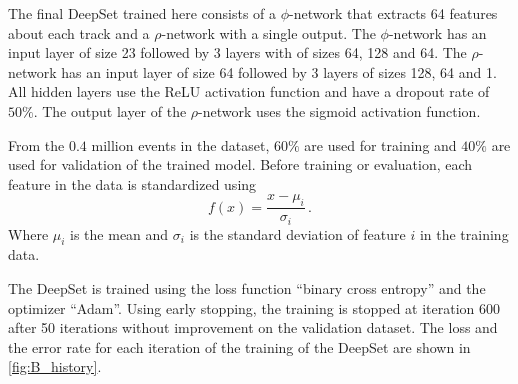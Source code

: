 The final DeepSet trained here consists of a $\phi$-network that extracts 64 features about each track and a $\rho$-network with a single output.
The $\phi$-network has an input layer of size 23 followed by 3 layers with of sizes 64, 128 and 64.
The $\rho$-network has an input layer of size 64 followed by 3 layers of sizes 128, 64 and 1.
All hidden layers use the ReLU activation function and have a dropout rate of $50\%$.
The output layer of the $\rho$-network uses the sigmoid activation function.

From the $0.4$ million events in the dataset, $60\%$ are used for training and $40\%$ are used for validation of the trained model.
Before training or evaluation, each feature in the data is standardized using 
\begin{equation*}
    f(x) = \frac{x - \mu_i}{\sigma_i} \, .
\end{equation*} 
Where $\mu_i$ is the mean and $\sigma_i$ is the standard deviation of feature $i$ in the training data.

The DeepSet is trained using the loss function \enquote{binary cross entropy} and the optimizer \enquote{Adam}. %
Using early stopping, the training is stopped at iteration 600 after 50 iterations without improvement on the validation dataset.
The loss and the error rate for each iteration of the training of the DeepSet are shown in \autoref{fig:B_history}.

